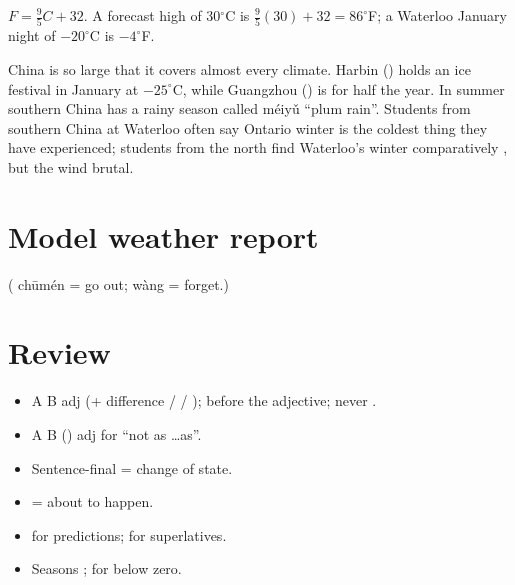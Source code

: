\begin{example}[Converting]
$F = \tfrac95 C + 32$. A forecast high of 30$^\circ$C is $\tfrac95(30)+32 = 86^\circ$F;
a Waterloo January night of $-20^\circ$C is $-4^\circ$F.
\end{example}

\begin{aside}
China is so large that it covers almost every climate. Harbin () holds an ice
festival in January at $-25^\circ$C, while Guangzhou () is  for half the
year. In summer southern China has a rainy season called  méiyǔ ``plum rain''.
Students from southern China at Waterloo often say Ontario winter is the coldest thing
they have experienced; students from the north find Waterloo's winter comparatively
, but the wind brutal.
\end{aside}

\section{Model weather report}


( chūmén = go out;  wàng = forget.)

\section*{Review}
\begin{itemize}
  \item A  B adj (+ difference /  / );  before the
        adjective; never .
  \item A  B () adj for ``not as \ldots as''.
  \item Sentence-final  = change of state.
  \item {} = about to happen.
  \item {} for predictions;  for superlatives.
  \item Seasons ;  for below zero.
\end{itemize}
